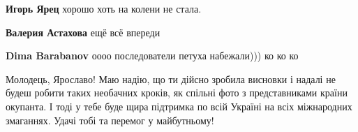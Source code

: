 \begin{itemize}
\begin{itemize}
 
\textbf{Игорь Ярец} хорошо хоть на колени не стала.

 
\textbf{Валерия Астахова} ещё всё впереди

 
\textbf{Dima Barabanov} оооо последователи петуха набежали))) ко ко ко
\end{itemize}

 

Молодець, Ярославо! Маю надію, що ти дійсно зробила висновки і надалі не будеш
робити таких необачних кроків, як спільні фото з представниками країни
окупанта. І тоді у тебе буде щира підтримка по всій Україні на всіх міжнародних
змаганнях. Удачі тобі та перемог у майбутньому!
\end{itemize}

